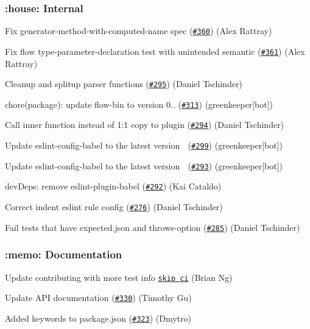 \subsubsection*{\+:house\+: Internal}

Fix generator-\/method-\/with-\/computed-\/name spec (\href{https://github.com/babel/babylon/pull/360}{\tt \#360}) (Alex Rattray)

Fix flow type-\/parameter-\/declaration test with unintended semantic (\href{https://github.com/babel/babylon/pull/361}{\tt \#361}) (Alex Rattray)

Cleanup and splitup parser functions (\href{https://github.com/babel/babylon/pull/295}{\tt \#295}) (Daniel Tschinder)

chore(package)\+: update flow-\/bin to version 0.. (\href{https://github.com/babel/babylon/pull/313}{\tt \#313}) (greenkeeper\mbox{[}bot\mbox{]})

Call inner function instead of 1\+:1 copy to plugin (\href{https://github.com/babel/babylon/pull/294}{\tt \#294}) (Daniel Tschinder)

Update eslint-\/config-\/babel to the latest version 🚀 (\href{https://github.com/babel/babylon/pull/299}{\tt \#299}) (greenkeeper\mbox{[}bot\mbox{]})

Update eslint-\/config-\/babel to the latest version 🚀 (\href{https://github.com/babel/babylon/pull/293}{\tt \#293}) (greenkeeper\mbox{[}bot\mbox{]})

dev\+Deps\+: remove eslint-\/plugin-\/babel (\href{https://github.com/babel/babylon/pull/292}{\tt \#292}) (Kai Cataldo)

Correct indent eslint rule config (\href{https://github.com/babel/babylon/pull/276}{\tt \#276}) (Daniel Tschinder)

Fail tests that have expected.\+json and throws-\/option (\href{https://github.com/babel/babylon/pull/285}{\tt \#285}) (Daniel Tschinder)

\subsubsection*{\+:memo\+: Documentation}

Update contributing with more test info \href{[#355](https://github.com/babel/babylon/pull/355)}{\tt skip ci} (Brian Ng)

Update A\+PI documentation (\href{https://github.com/babel/babylon/pull/330}{\tt \#330}) (Timothy Gu)

Added keywords to package.\+json (\href{https://github.com/babel/babylon/pull/323}{\tt \#323}) (Dmytro)


